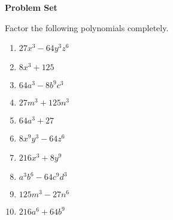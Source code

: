 \textbf{Problem Set}

\vspce

Factor the following polynomials completely.  
\begin{enumerate} 


\item \hspce $27x^{3} - 64y^{3}z^{6}$
\item \hspce $8x^{3} + 125$
\item \hspce $64a^{3} - 8b^{9}c^{3}$
\item \hspce $27m^{3} + 125n^{3}$
\item \hspce $64a^{3} + 27$
\item \hspce $8x^{9}y^3 - 64z^{6}$
\item \hspce $216x^{3} + 8y^9$
\item \hspce $a^{3}b^6 - 64c^{9}d^{3}$
\item \hspce $125m^{3} - 27n^{6}$
\item \hspce $216a^{6} + 64b^9$

 
\end{enumerate}